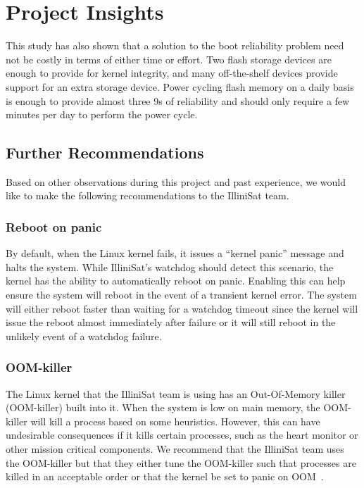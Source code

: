 \section{Project Insights}\label{sec:insights}

This study has also shown that a solution to the boot reliability problem need not be costly in terms of either time or effort.  Two flash storage devices are enough to provide for kernel integrity, and many off-the-shelf devices provide support for an extra storage device.  Power cycling flash memory on a daily basis is enough to provide almost three 9s of reliability and should only require a few minutes per day to perform the power cycle.

\subsection{Further Recommendations}
Based on other observations during this project and past experience, we would
like to make the following recommendations to the IlliniSat team.

\subsubsection{Reboot on panic} By default, when the Linux kernel fails, it
issues a ``kernel panic'' message and halts the system.  While IlliniSat's
watchdog should detect this scenario, the kernel has the ability to
automatically reboot on panic.  Enabling this can help ensure the system will
reboot in the event of a transient kernel error. The system will either reboot
faster than waiting for a watchdog timeout since the kernel will issue the
reboot almost immediately after failure or it will still reboot in the unlikely
event of a watchdog failure.

\subsubsection{OOM-killer} The Linux kernel that the IlliniSat team is using
has an Out-Of-Memory killer (OOM-killer) built into it. When the system is 
low on main memory, the OOM-killer will kill a process based on some heuristics.
However, this can have undesirable consequences if it kills certain processes, such
as the heart monitor or other mission critical components. We recommend that the
IlliniSat team uses the OOM-killer but that they either tune the OOM-killer such 
that processes are killed in an acceptable order or that the kernel be set
to panic on OOM~\cite{oracleoom}.

